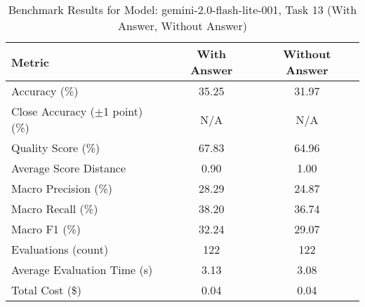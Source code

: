 \begin{table}[htbp]
\centering
\caption{Benchmark Results for Model: gemini-2.0-flash-lite-001, Task 13 (With Answer, Without Answer)}
\begin{tabular}{lcc}
\toprule
\textbf{Metric} & \textbf{With Answer} & \textbf{Without Answer} \\
\midrule
Accuracy (\%) & 35.25 & 31.97 \\
Close Accuracy ($\pm$1 point) (\%) & N/A & N/A \\
Quality Score (\%) & 67.83 & 64.96 \\
Average Score Distance & 0.90 & 1.00 \\
Macro Precision (\%) & 28.29 & 24.87 \\
Macro Recall (\%) & 38.20 & 36.74 \\
Macro F1 (\%) & 32.24 & 29.07 \\
Evaluations (count) & 122 & 122 \\
Average Evaluation Time (s) & 3.13 & 3.08 \\
Total Cost (\$) & 0.04 & 0.04 \\
\bottomrule
\end{tabular}
\end{table}